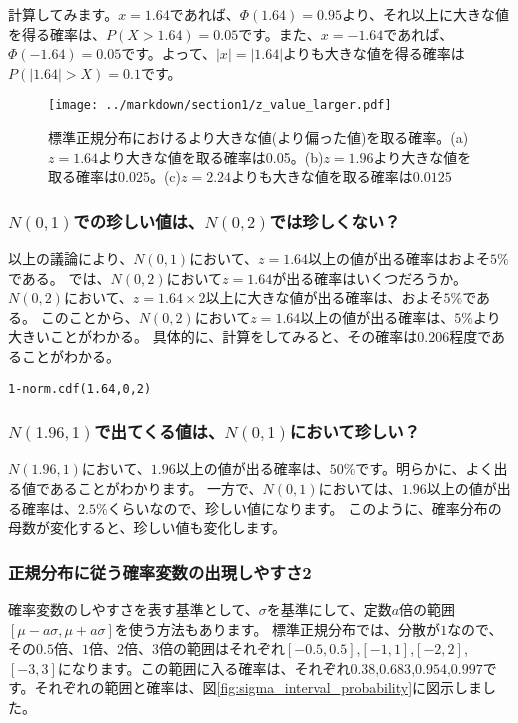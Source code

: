 \documentclass[a4paper,11pt,dvipdfmx]{jsarticle}
\begin{document}
計算してみます。$x=1.64$であれば、$\varPhi(1.64)=0.95$より、それ以上に大きな値を得る確率は、$P(X>1.64)=0.05$です。また、$x=-1.64$であれば、$\varPhi(-1.64)=0.05$です。よって、$|x|=|1.64|$よりも大きな値を得る確率は$P(|1.64|>X)=0.1$です。


\begin{figure}
    \begin{center}
        \texttt{[image: ../markdown/section1/z\_value\_larger.pdf]}
        \caption{標準正規分布におけるより大きな値(より偏った値)を取る確率。(a)$z=1.64$より大きな値を取る確率は0.05。(b)$z=1.96$より大きな値を取る確率は$0.025$。(c)$z=2.24$よりも大きな値を取る確率は$0.0125$}
        \label{fig:z_value_larger}
      \end{center}
    \end{figure}

\subsubsection{$N(0,1)$での珍しい値は、$N(0,2)$では珍しくない？}
以上の議論により、$N(0,1)$において、$z=1.64$以上の値が出る確率はおよそ$5\%$である。
では、$N(0,2)$において$z=1.64$が出る確率はいくつだろうか。
$N(0,2)$において、$z=1.64\times2$以上に大きな値が出る確率は、およそ$5\%$である。
このことから、$N(0,2)$において$z=1.64$以上の値が出る確率は、$5\%$より大きいことがわかる。
具体的に、計算をしてみると、その確率は$0.206$程度であることがわかる。
\begin{lstlisting}
1-norm.cdf(1.64,0,2)
\end{lstlisting}

\subsubsection{$N(1.96,1)$で出てくる値は、$N(0,1)$において珍しい？}
$N(1.96,1)$において、$1.96$以上の値が出る確率は、$50\%$です。明らかに、よく出る値であることがわかります。
一方で、$N(0,1)$においては、$1.96$以上の値が出る確率は、$2.5\%$くらいなので、珍しい値になります。
このように、確率分布の母数が変化すると、珍しい値も変化します。




\subsubsection{正規分布に従う確率変数の出現しやすさ2}
確率変数のしやすさを表す基準として、$\sigma$を基準にして、定数$a$倍の範囲$[\mu-a\sigma,\mu+a\sigma]$を使う方法もあります。
標準正規分布では、分散が$1$なので、その$0.5$倍、$1$倍、$2$倍、$3$倍の範囲はそれぞれ$[-0.5,0.5]$,$[-1,1]$,$[-2,2]$,$[-3,3]$になります。この範囲に入る確率は、それぞれ$0.38$,$0.683$,$0.954$,$0.997$です。それぞれの範囲と確率は、図\ref{fig:sigma_interval_probability}に図示しました。
\end{document}
